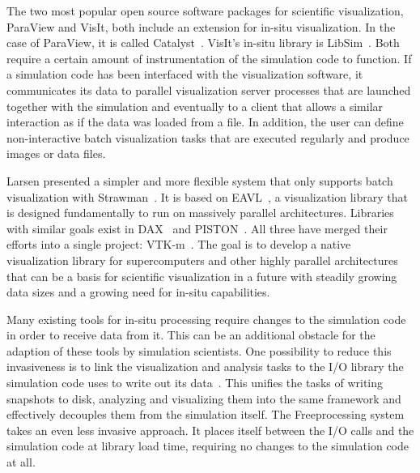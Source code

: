 %
The two most popular open source software packages for scientific visualization,
ParaView and VisIt, both include an extension for in-situ visualization.
%
In the case of ParaView, it is called Catalyst~\cite{Ayachit2015}.
%
VisIt's in-situ library is LibSim~\cite{Whitlock2011}.
%
Both require a certain amount of instrumentation of the simulation code to
function.
%
If a simulation code has been interfaced with the visualization software, it
communicates its data to parallel visualization server processes that are
launched together with the simulation and eventually to a client that
allows a similar interaction as if the data was loaded from a file.
%
In addition, the user can define non-interactive batch visualization tasks that
are executed regularly and produce images or data files.
%

%
Larsen \etal{} presented a simpler and more flexible system that only supports
batch visualization with Strawman~\cite{Larsen2015}.
%
It is based on EAVL~\cite{Meredith2012}, a visualization library that is
designed fundamentally to run on massively parallel architectures.
%
Libraries with similar goals exist in DAX~\cite{Moreland2011} and
PISTON~\cite{Lo2012}.
%
All three have merged their efforts into a single project:
VTK-m~\cite{Moreland2016}.
%
The goal is to develop a native visualization library for supercomputers and
other highly parallel architectures that can be a basis for scientific
visualization in a future with steadily growing data sizes and a growing need
for in-situ capabilities.
%

%
Many existing tools for in-situ processing require changes to the simulation
code in order to receive data from it.
%
This can be an additional obstacle for the adaption of these tools by simulation
scientists.
%
One possibility to reduce this invasiveness is to link the visualization and
analysis tasks to the I/O library the simulation code uses to write out its
data~\cite{Vishwanath2011,Biddiscombe2011,Dorier2013}.
%
This unifies the tasks of writing snapshots to disk, analyzing and visualizing
them into the same framework and effectively decouples them from the simulation
itself.
%
The Freeprocessing system~\cite{Fogal2014} takes an even less invasive approach.
%
It places itself between the I/O calls and the simulation code at library load
time, requiring no changes to the simulation code at all.
%

